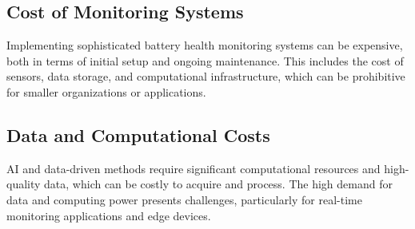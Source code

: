 \subsection{Cost of Monitoring Systems}
Implementing sophisticated battery health monitoring systems can be expensive, both in terms of initial setup and ongoing maintenance. 
This includes the cost of sensors, data storage, and computational infrastructure, which can be prohibitive for smaller organizations or applications.

\subsection{Data and Computational Costs}
AI and data-driven methods require significant computational resources and high-quality data, which can be costly to acquire and process. 
The high demand for data and computing power presents challenges, particularly for real-time monitoring applications and edge devices.





